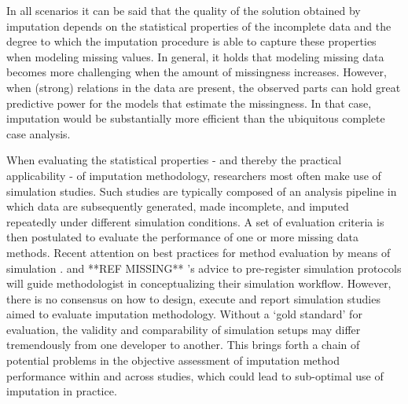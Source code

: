 \documentclass[bimj,fleqn]{w-art}
\begin{document}
In all scenarios it can be said that the quality of the solution obtained by imputation depends on the statistical properties of the incomplete data and the degree to which the imputation procedure is able to capture these properties when modeling missing values. In general, it holds that modeling missing data becomes more challenging when the amount of missingness increases. However, when (strong) relations in the data are present, the observed parts can hold great predictive power for the models that estimate the missingness. In that case, imputation would be substantially more efficient than the ubiquitous complete case analysis.


When evaluating the statistical properties - and thereby the practical applicability - of imputation methodology, researchers most often make use of simulation studies. Such studies are typically composed of an analysis pipeline in which data are subsequently generated, made incomplete, and imputed repeatedly under different simulation conditions. A set of evaluation criteria is then postulated to evaluate the performance of one or more missing data methods. Recent attention on best practices for method evaluation by means of simulation \citep{morr18}. and **REF MISSING** \citet{pawe22}'s advice to pre-register simulation protocols will guide methodologist in conceptualizing their simulation workflow. However, there is no consensus on how to design, execute and report simulation studies aimed to evaluate imputation methodology. Without a `gold standard' for evaluation, the validity and comparability of simulation setups may differ tremendously from one developer to another. This brings forth a chain of potential problems in the objective assessment of imputation method performance within and across studies, which could lead to sub-optimal use of imputation in practice.
\end{document}

